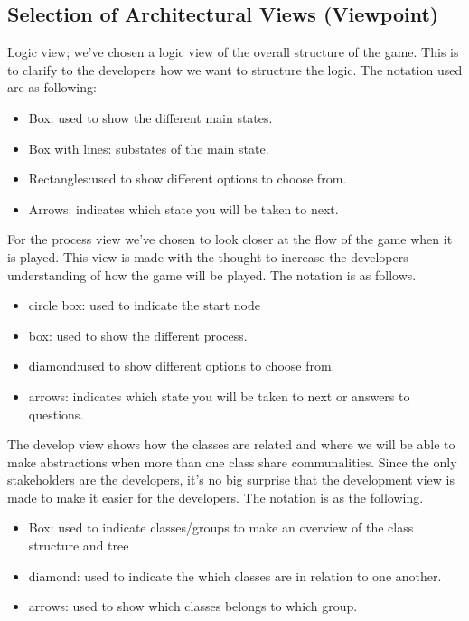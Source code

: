 \subsection{Selection of Architectural Views (Viewpoint)}

Logic view; we’ve chosen a logic view of the overall structure of the game. This is to clarify to the developers how we want to structure the logic. The notation used are as following:\\
\begin{itemize}
	\item Box: used to show the different main states.
	\item Box with lines: substates of the main state.
	\item Rectangles:used to show different options to choose from. 
	\item Arrows: indicates which state you will be taken to next.
\end{itemize}

For the process view we’ve chosen to look closer at the flow of the game when it is played. This view is made with the thought to increase the developers understanding of how the game will be played. The notation is as follows.\\

\begin{itemize}
	\item circle box: used to indicate the start node
	\item  box: used to show the different process.
	\item diamond:used to show different options to choose from. 
	\item arrows: indicates which state you will be taken to next or answers to questions.
\end{itemize}

The develop view shows how the classes are related and where we will be able to make abstractions when more than one class share communalities. Since the only stakeholders are the developers, it’s no big surprise that the development view is made to make it easier for the developers. The notation is as the following. \\

\begin{itemize}
	\item Box: used to indicate classes/groups to make an overview of the class structure and tree
	\item diamond: used to indicate the which classes are in relation to one another.
	\item arrows: used to show which classes belongs to which group.
\end{itemize}
